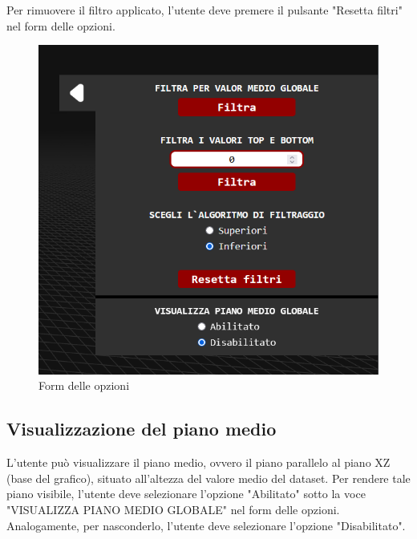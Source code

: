 Per rimuovere il filtro applicato, l'utente deve premere il pulsante "Resetta filtri" nel form delle opzioni.
\begin{figure}[ht!]
    \centering
    \includegraphics[scale=0.6]{template/images/options.png}
    \caption{Form delle opzioni}
\end{figure}

\subsection{Visualizzazione del piano medio}
L'utente può visualizzare il piano medio, ovvero il piano parallelo al
piano XZ (base del grafico), situato all'altezza del valore medio del dataset.
Per rendere tale piano visibile, l'utente deve selezionare l'opzione "Abilitato" sotto la voce
"VISUALIZZA PIANO MEDIO GLOBALE" nel form delle opzioni. Analogamente, per
nasconderlo, l'utente deve selezionare l'opzione "Disabilitato".

